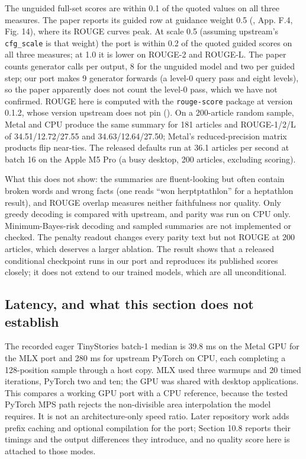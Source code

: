 \documentclass[
  british,
]{article}
\begin{document}
The unguided full-set scores are within 0.1 of the quoted values on all
three measures. The paper reports its guided row at guidance weight 0.5
(, App. F.4, Fig. 14), where
its ROUGE curves peak. At scale 0.5 (assuming upstream's
\texttt{cfg\_scale} is that weight) the port is within 0.2 of the quoted
guided scores on all three measures; at 1.0 it is lower on ROUGE-2 and
ROUGE-L. The paper counts generator calls per output, 8 for the unguided
model and two per guided step; our port makes 9 generator forwards (a
level-0 query pass and eight levels), so the paper apparently does not
count the level-0 pass, which we have not confirmed. ROUGE here is
computed with the \texttt{rouge-score} package at version 0.1.2, whose
version upstream does not pin (). On a
200-article random sample, Metal and CPU produce the same summary for
181 articles and ROUGE-1/2/L of 34.51/12.72/27.55 and 34.63/12.64/27.50;
Metal's reduced-precision matrix products flip near-ties. The released
defaults run at 36.1 articles per second at batch 16 on the Apple M5 Pro
(a busy desktop, 200 articles, excluding scoring).

What this does not show: the summaries are fluent-looking but often
contain broken words and wrong facts (one reads ``won herptptathlon''
for a heptathlon result), and ROUGE overlap measures neither
faithfulness nor quality. Only greedy decoding is compared with
upstream, and parity was run on CPU only. Minimum-Bayes-risk decoding
and sampled summaries are not implemented or checked. The penalty
readout changes every parity text but not ROUGE at 200 articles, which
deserves a larger ablation. The result shows that a released conditional
checkpoint runs in our port and reproduces its published scores closely;
it does not extend to our trained models, which are all unconditional.

\subsection{Latency, and what this section does not
establish}\label{latency-and-what-this-section-does-not-establish}

The recorded eager TinyStories batch-1 median is 39.8 ms on the Metal
GPU for the MLX port and 280 ms for upstream PyTorch on CPU, each
completing a 128-position sample through a host copy. MLX used three
warmups and 20 timed iterations, PyTorch two and ten; the GPU was shared
with desktop applications. This compares a working GPU port with a CPU
reference, because the tested PyTorch MPS path rejects the non-divisible
area interpolation the model requires. It is not an architecture-only
speed ratio. Later repository work adds prefix caching and optional
compilation for the port; Section 10.8 reports their timings and the
output differences they introduce, and no quality score here is attached
to those modes.
\end{document}
